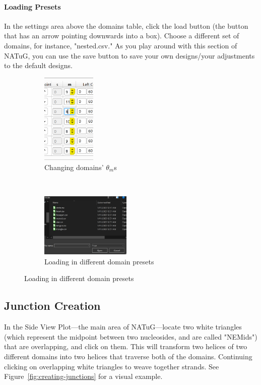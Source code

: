 \documentclass[
titlepage,
fontsize=12pt
]{article}
\begin{document}
	\paragraph{Loading Presets} In the settings area above the domains table, click the load button (the button that has an arrow pointing downwards into a box). Choose a different set of domains, for instance, "nested.csv." As you play around with this section of NATuG, you can use the save button to save your own designs/your adjustments to the default designs.
	
	\begin{figure}[h]
		\caption{Changing up domain settings}
		\centering
		\begin{subfigure}{.5\textwidth}
			\centering
			\includegraphics[height=1.7in]{changing-theta-ms.png}
			\caption{Changing domains' $\theta_{m}$s}
		\end{subfigure}%
		~
		\begin{subfigure}{.5\textwidth}
			\centering
			\includegraphics[width=1.7in]{loading-domains.png}
			\caption{Loading in different domain presets}
		\end{subfigure}
	\end{figure}
	
	\subsection{Junction Creation}
	
	In the Side View Plot---the main area of NATuG---locate two white triangles (which represent the midpoint between two nucleosides, and are called "NEMids") that are overlapping, and click on them. This will transform two helices of two different domains into two helices that traverse both of the domains. Continuing clicking on overlapping white triangles to weave together strands. See Figure~\ref{fig:creating-junctions} for a visual example.
	
\end{document}
